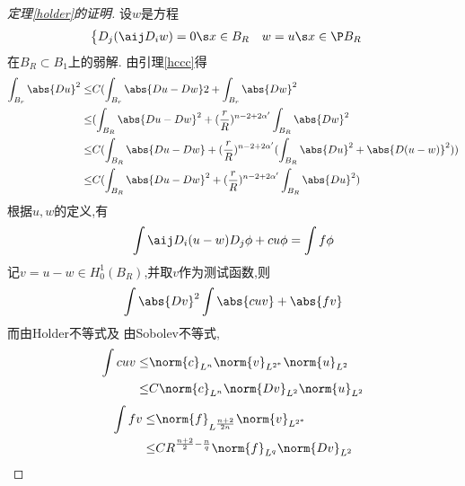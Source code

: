 \begin{proof}[定理\eqref{holder}的证明]
    设$w$是方程
    \begin{equation}
        \left\{
            \begin{aligned}
                & D_j(\aij D_iw)=0  \s x \in B_R&
                & w=u \s x \in \P B_R
            \end{aligned}
        \right.
    \end{equation}
    在$B_R \subset B_1$上的弱解.  由引理\eqref{hccc}得
    \begin{equation}\label{hhhstar}
        \begin{split}
            \int_{B_r}\abs{Du}^2 \le& C(\int_{B_r}\abs{Du-Dw}2+\int_{B_r}\abs{Dw}^2 \\
            \le &(\int_{B_R}\abs{Du-Dw}^2+(\frac{r}{R})^{n-2+2\alpha'}\int_{B_R}\abs{Dw}^2 \\
            \le & C(\int_{B_R}\abs{Du-Dw}+(\frac{r}{R})^{n-2+2\alpha'}(\int_{B_R}\abs{Du}^2+\abs{D(u-w)}^2))\\
            \le & C(\int_{B_R}\abs{Du-Dw}^2+(\frac{r}{R})^{n-2+2\alpha'}\int_{B_R}\abs{Du}^2)
        \end{split}
    \end{equation}
    根据$u,w$的定义,有
    \begin{equation}
        \int \aij D_i(u-w)D_j\phi + cu\phi = \int f\phi
    \end{equation}
    记$v=u-w \in H^1_0(B_R)$,并取$v$作为测试函数,则
    \begin{equation} \label{hsharp}
        \int \abs{Dv}^2 \int \abs{cuv}+\abs{fv}
    \end{equation}
    而由Holder不等式及 由Sobolev不等式,
    \begin{equation}
        \begin{split}
            \int cuv \le & \norm{c}_{L^n} \norm{v}_{L^{2^*}} \norm{{u}}_{L^2} \\
            \le & C\norm{c}_{L^n}\norm{Dv}_{L^2}\norm{u}_{L^2}
        \end{split}
    \end{equation}
    \begin{equation}
        \begin{split}
            \int fv \le & \norm{f}_{L^{\frac{n+2}{2n}}}\norm{v}_{L^{2^*}} \\
            \le & CR^{\frac{n+2}{2}-\frac{n}{q}}\norm{f}_{L^q}\norm{Dv}_{L^2}
        \end{split}
    \end{equation}

\end{proof}
